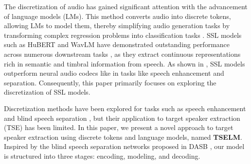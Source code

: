 \documentclass[conference]{IEEEtran}
\begin{document}
The discretization of audio has gained significant attention with the advancement of language models (LMs). This method converts audio into discrete tokens, allowing LMs to model them, thereby simplifying audio generation tasks by transforming complex regression problems into classification tasks \cite{dasb}. SSL models such as HuBERT \cite{hubert} and WavLM \cite{wavlm} have demonstrated outstanding performance across numerous downstream tasks \cite{superb}, as they extract continuous representations rich in semantic and timbral information from speech. As shown in \cite{dasb}, SSL models outperform neural audio codecs like \cite{dac} in tasks like speech enhancement and separation. Consequently, this paper primarily focuses on exploring the discretization of SSL models.

Discretization methods have been explored for tasks such as speech enhancement \cite{selm} and blind speech separation \cite{dasb,tokensplit}, but their application to target speaker extraction (TSE) has been limited. In this paper, we present a novel approach to target speaker extraction using discrete tokens and language models, named \textbf{TSELM}. Inspired by the blind speech separation networks proposed in DASB \cite{dasb}, our model is structured into three stages: encoding, modeling, and decoding.
\end{document}
